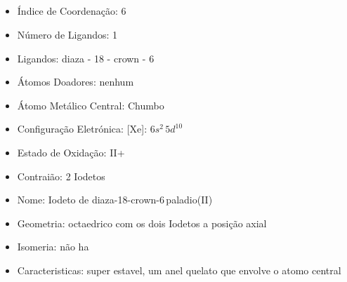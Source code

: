 \documentclass[12pt]{article}
\begin{document}
\noindent\begin{minipage}{\textwidth}
	
	\subsection{}
	\begin{itemize}
   
   \item Índice de Coordenação:
   	6
   
   \item Número de Ligandos:
   	1
   
   \item Ligandos:
   	diaza - 18 - crown - 6 
   
   \item Átomos Doadores:
   	nenhum
   
   \item Átomo Metálico Central:
   	Chumbo
   
   \item Configuração Eletrónica:
   	[Xe]: $6s^2\,5d^{10}$	
	
   \item Estado de Oxidação:
   	II+
	
   \item Contraião:
   	2 Iodetos 
   
   \item Nome:
   	Iodeto de diaza-18-crown-6\,paladio(II)
   
   \item Geometria:
   	octaedrico com os dois Iodetos a posição axial
   
   \item Isomeria:
   	não ha

	\item Caracteristicas:
		super estavel, um anel quelato que envolve o atomo central

	\end{itemize}
	
\end{minipage}
\end{document}

